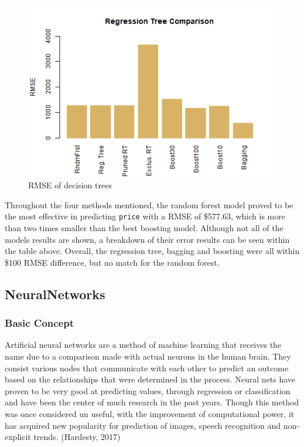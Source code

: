 \documentclass[
  paper=a4,
  ,captions=tableheading
]{scrartcl}
\begin{document}
\begin{figure}[H]

{\centering \includegraphics[width=0.5\linewidth,]{Diamonds_PDF_files/figure-latex/RegTree Summary-1}

}

\caption{RMSE of decision trees}\label{fig:RegTree Summary}
\end{figure}

Throughout the four methods mentioned, the random forest model proved to
be the most effective in predicting \texttt{price} with a RMSE of
\$577.63, which is more than two times smaller than the best boosting
model. Although not all of the models results are shown, a breakdown of
their error results can be seen within the table above. Overall, the
regression tree, bagging and boosting were all within \$100 RMSE
difference, but no match for the random forest.

\hypertarget{neuralnetworks}{%
\subsection{NeuralNetworks}\label{neuralnetworks}}

\hypertarget{basic-concept}{%
\subsubsection{Basic Concept}\label{basic-concept}}

Artificial neural networks are a method of machine learning that
receives the name due to a comparison made with actual neurons in the
human brain. They consist various nodes that communicate with each other
to predict an outcome based on the relationships that were determined in
the process. Neural nets have proven to be very good at predicting
values, through regression or classification and have been the center of
much research in the past years. Though this method was once considered
un useful, with the improvement of computational power, it has acquired
new popularity for prediction of images, speech recognition and
non-explicit trends. (Hardesty, 2017)
\end{document}
